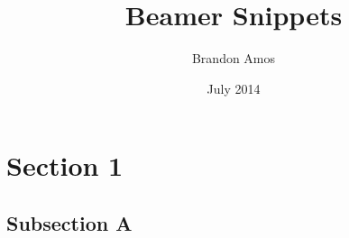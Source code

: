 \documentclass{beamer}
\begin{document}
\title{Beamer Snippets}\author{Brandon Amos}\date{July 2014}

\section{Section 1}
\subsection{Subsection A}
\frame{\titlepage}
\end{document}

